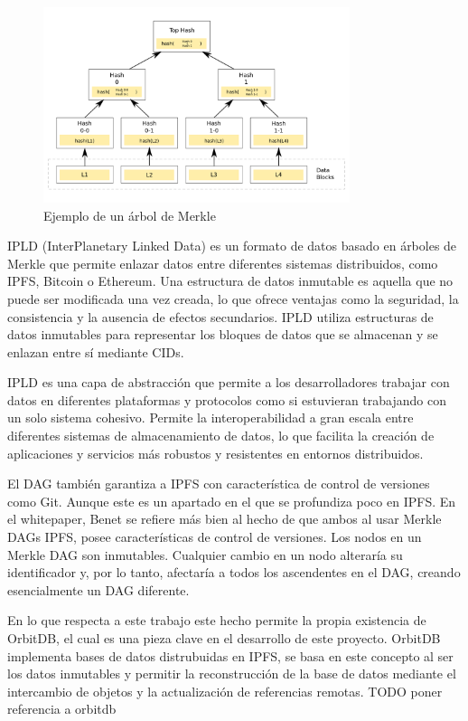 \begin{figure}[H]
      \centering
      \includegraphics[width=0.8\textwidth]{images/merkledag.png}
      \caption{Ejemplo de un árbol de Merkle}
      \label{merkledag}
\end{figure}

IPLD (InterPlanetary Linked Data)\cite{IPLDDocs} es un formato de datos basado en árboles de Merkle que permite enlazar datos entre diferentes sistemas distribuidos, como IPFS,
Bitcoin o Ethereum. Una estructura de datos inmutable es aquella que no puede ser modificada una vez creada, lo que ofrece ventajas como la seguridad, la
consistencia y la ausencia de efectos secundarios. IPLD utiliza estructuras de datos inmutables para representar los bloques de datos que se almacenan y se
enlazan entre sí mediante CIDs.

IPLD es una capa de abstracción que permite a los desarrolladores trabajar con datos en diferentes plataformas y protocolos como si estuvieran trabajando con un solo sistema cohesivo. Permite la interoperabilidad a gran escala entre diferentes sistemas de almacenamiento de datos, lo que facilita la creación de aplicaciones y servicios más robustos y resistentes en entornos distribuidos.

El DAG también garantiza a IPFS con característica de control de versiones como Git. Aunque este es un apartado en el que se profundiza poco en IPFS.
En el whitepaper, Benet se refiere más bien al hecho de que ambos al usar Merkle DAGs IPFS, posee características de control de versiones. Los nodos en un Merkle DAG son inmutables. Cualquier cambio en un nodo alteraría su identificador y, por lo tanto, afectaría a todos los ascendentes en el DAG, creando esencialmente un DAG diferente.

En lo que respecta a este trabajo este hecho permite la propia existencia de OrbitDB, el cual es una pieza clave en el desarrollo de este proyecto. OrbitDB implementa bases de datos distrubuidas en IPFS, se basa en este concepto al ser los datos inmutables y permitir la reconstrucción de la base de datos mediante el intercambio de objetos y la actualización de referencias remotas.
TODO poner referencia a orbitdb

